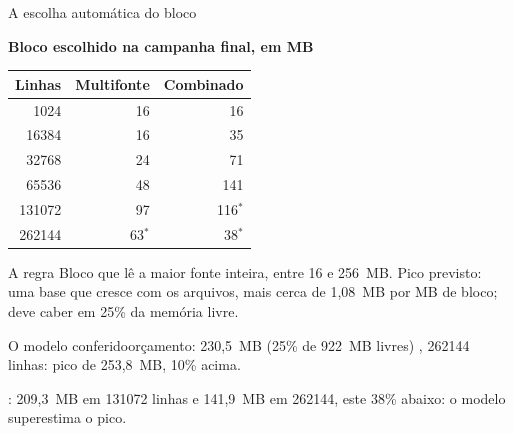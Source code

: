 \begin{frame}{A escolha automática do bloco}
  \begin{minipage}[t]{0.42\textwidth}
    \vspace{0pt}
    {\footnotesize\raggedright\bfseries\color{ufscazul}Bloco escolhido na campanha final,
     em MB\par}
    \smallskip
    \footnotesize
    \setlength{\tabcolsep}{4pt}
    \renewcommand{\arraystretch}{1.1}
    \begin{tabular}{@{}r r r@{}}
      \toprule
      \bfseries Linhas & \bfseries Multifonte & \bfseries Combinado \\
      \midrule
      \num{1024}   & 16 & 16 \\
      \num{16384}  & 16 & 35 \\
      \num{32768}  & 24 & 71 \\
      \num{65536}  & 48 & 141 \\
      \num{131072} & 97 & 116$^{*}$ \\
      \num{262144} & 63$^{*}$ & 38$^{*}$ \\
      \bottomrule
    \end{tabular}\par
    \smallskip
  \end{minipage}\hfill
  \begin{minipage}[t]{0.54\textwidth}
    \vspace{0pt}\footnotesize{}
    \begin{painel}{A regra}{}
      Bloco que lê a maior fonte inteira, entre 16 e 256~MB. Pico previsto: uma base que
      cresce com os arquivos, mais cerca de 1,08~MB por MB de bloco; deve caber em 25\% da
      memória livre.
    \end{painel}
    \begin{painel}{O modelo conferido}{orçamento: 230,5~MB (25\% de 922~MB livres)}
      , \num{262144} linhas: pico de 253,8~MB, 10\% acima.\par
      : 209,3~MB em \num{131072} linhas e 141,9~MB em \num{262144},
      este 38\% abaixo: o modelo superestima o pico.
    \end{painel}
  \end{minipage}\par
  \vfill
\end{frame}

